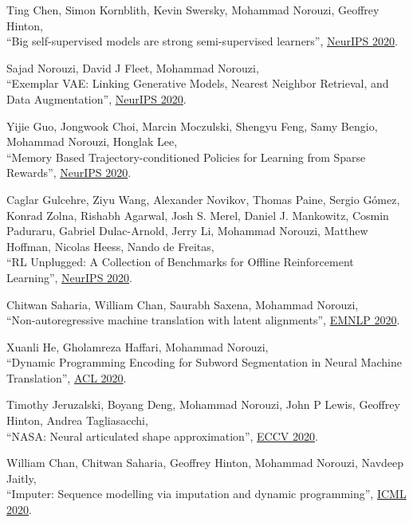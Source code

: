 \documentclass[10pt,letterpaper]{article}
\renewenvironment{itemize}{
  \begin{list}{}{
    \setlength{\leftmargin}{1.5em}
  }
}{
  \end{list}
}
\begin{document}
\begin{itemize}
\item Ting Chen, Simon Kornblith, Kevin Swersky, Mohammad Norouzi, Geoffrey Hinton,\\
``Big self-supervised models are strong semi-supervised learners'',
\href{https://arxiv.org/pdf/2006.10029}{NeurIPS 2020}.

\item Sajad Norouzi, David J Fleet, Mohammad Norouzi,\\
``Exemplar VAE: Linking Generative Models, Nearest Neighbor Retrieval, and Data Augmentation'',
\href{https://arxiv.org/pdf/2004.04795.pdf}{NeurIPS 2020}.

\item Yijie Guo, Jongwook Choi, Marcin Moczulski, Shengyu Feng, Samy Bengio, Mohammad Norouzi, Honglak Lee,\\
``Memory Based Trajectory-conditioned Policies for Learning from Sparse Rewards'',
\href{https://arxiv.org/pdf/1907.10247}{NeurIPS 2020}.

\item Caglar Gulcehre, Ziyu Wang, Alexander Novikov, Thomas Paine, Sergio Gómez, Konrad Zolna, Rishabh Agarwal, Josh S. Merel, Daniel J. Mankowitz, Cosmin Paduraru, Gabriel Dulac-Arnold, Jerry Li, Mohammad Norouzi, Matthew Hoffman, Nicolas Heess, Nando de Freitas,\\
``RL Unplugged: A Collection of Benchmarks for Offline Reinforcement Learning'',
\href{https://arxiv.org/pdf/2006.13888.pdf}{NeurIPS 2020}.

\item Chitwan Saharia, William Chan, Saurabh Saxena, Mohammad Norouzi,\\
``Non-autoregressive machine translation with latent alignments'',
\href{https://arxiv.org/pdf/2004.07437.pdf}{EMNLP 2020}.

\item Xuanli He, Gholamreza Haffari, Mohammad Norouzi,\\
``Dynamic Programming Encoding for Subword Segmentation in Neural Machine Translation'',
\href{https://arxiv.org/pdf/2005.06606.pdf}{ACL 2020}.

\item Timothy Jeruzalski, Boyang Deng, Mohammad Norouzi, John P Lewis, Geoffrey Hinton, Andrea Tagliasacchi,\\
``NASA: Neural articulated shape approximation'',
\href{https://arxiv.org/pdf/1912.03207.pdf}{ECCV 2020}.

\item William Chan, Chitwan Saharia, Geoffrey Hinton, Mohammad Norouzi, Navdeep Jaitly,\\
``Imputer: Sequence modelling via imputation and dynamic programming'',
\href{https://arxiv.org/pdf/2002.08926.pdf}{ICML 2020}.


\end{itemize}
\end{document}
